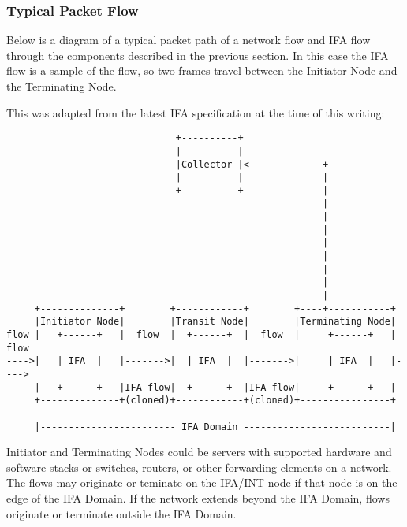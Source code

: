\documentclass[letterpaper,twocolumn,10pt]{article}
\begin{document}
\subsubsection{Typical Packet Flow}

Below is a diagram of a typical packet path of a network flow and IFA
flow through the components described in the previous section.  In this
case the IFA flow is a sample of the flow, so two frames travel between
the Initiator Node and the Terminating Node.

This was adapted from the latest IFA specification at the time of this
writing:
\tiny
\begin{center}
\begin{verbatim}
                              +----------+
                              |          |
                              |Collector |<-------------+
                              |          |              |
                              +----------+              |
                                                        |
                                                        |
                                                        |
                                                        |
                                                        |
                                                        |
                                                        | 
                                                        |
     +--------------+        +------------+        +----+-----------+
     |Initiator Node|        |Transit Node|        |Terminating Node|
flow |   +------+   |  flow  |  +------+  |  flow  |     +------+   | flow
---->|   | IFA  |   |------->|  | IFA  |  |------->|     | IFA  |   |---->
     |   +------+   |IFA flow|  +------+  |IFA flow|     +------+   |
     +--------------+(cloned)+------------+(cloned)+----------------+

     |------------------------ IFA Domain --------------------------|

\end{verbatim}
\end{center}
\normalsize

Initiator and Terminating Nodes could be servers with supported hardware
and software stacks or switches, routers, or other forwarding elements
on a network.  The flows may originate or teminate on the IFA/INT node
if that node is on the edge of the IFA Domain.  If the network extends
beyond the IFA Domain, flows originate or terminate outside the IFA
Domain.
\end{document}
